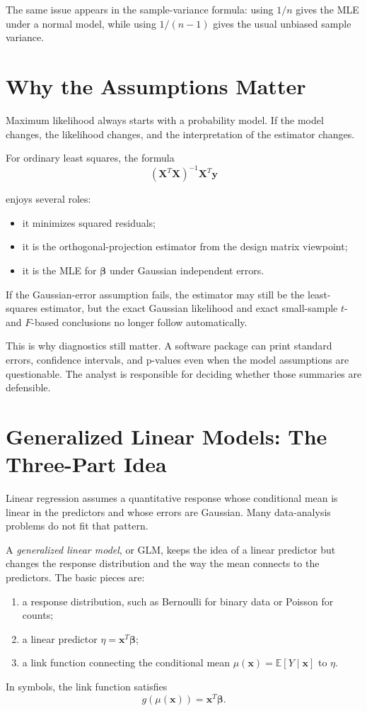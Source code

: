 The same issue appears in the sample-variance formula: using \(1/n\) gives the MLE under a normal model, while using \(1/(n-1)\) gives the usual unbiased sample variance.

\section{Why the Assumptions Matter}

Maximum likelihood always starts with a probability model.  If the model changes, the likelihood changes, and the interpretation of the estimator changes.

For ordinary least squares, the formula
\begin{equation}
  (\mathbf{X}^T\mathbf{X})^{-1}\mathbf{X}^T\mathbf{y}
\end{equation}

enjoys several roles:
\begin{itemize}
  \item it minimizes squared residuals;
  \item it is the orthogonal-projection estimator from the design matrix viewpoint;
  \item it is the MLE for \(\boldsymbol{\beta}\) under Gaussian independent errors.
\end{itemize}
If the Gaussian-error assumption fails, the estimator may still be the least-squares estimator, but the exact Gaussian likelihood and exact small-sample \(t\)- and \(F\)-based conclusions no longer follow automatically.

This is why diagnostics still matter.  A software package can print standard errors, confidence intervals, and p-values even when the model assumptions are questionable.  The analyst is responsible for deciding whether those summaries are defensible.

\section{Generalized Linear Models: The Three-Part Idea}

Linear regression assumes a quantitative response whose conditional mean is linear in the predictors and whose errors are Gaussian.  Many data-analysis problems do not fit that pattern.

A \emph{generalized linear model}, or GLM, keeps the idea of a linear predictor but changes the response distribution and the way the mean connects to the predictors.  The basic pieces are:
\begin{enumerate}
  \item a response distribution, such as Bernoulli for binary data or Poisson for counts;
  \item a linear predictor \(\eta=\mathbf{x}^T\boldsymbol{\beta}\);
  \item a link function connecting the conditional mean \(\mu(\mathbf{x})=\mathbb{E}[Y\mid \mathbf{x}]\) to \(\eta\).
\end{enumerate}
In symbols, the link function satisfies
\begin{equation}
  g(\mu(\mathbf{x}))=\mathbf{x}^T\boldsymbol{\beta}.
\end{equation}

